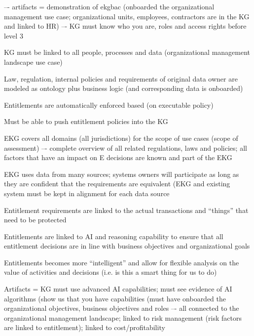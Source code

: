 \begin{scoring}

    \item {} –- artifacts = demonstration of \gls{ekgbac}
          (onboarded the organizational management use case; organizational units, employees, contractors are in
          the KG and linked to HR) –- KG must know who you are, roles and access rights before level 3
    \item KG must be linked to all people, processes and data (organizational management landscape use case)
    \item Law, regulation, internal policies and requirements of original data owner are modeled as ontology
          plus business logic (and corresponding data is onboarded)
    \item Entitlements are automatically enforced based (on executable policy)
    \item Must be able to push entitlement policies into the KG
    \item EKG covers all domains (all jurisdictions) for the scope of use cases (scope of assessment) –-
          complete overview of all related regulations, laws and policies;
          all factors that have an impact on E decisions are known and part of the EKG
    \item EKG uses data from many sources; systems owners will participate as long as they are confident that
          the requirements are equivalent (EKG and existing system must be kept in alignment for each data source
    \item Entitlement requirements are linked to the actual transactions and “things” that need to be protected

\end{scoring}

\kgmmscoringlevelFour

\begin{scoring}

  \item Entitlements are linked to AI and reasoning capability to ensure that all entitlement decisions are
        in line with business objectives and organizational goals
  \item Entitlements becomes more “intelligent” and allow for flexible analysis on the value of
        activities and decisions (i.e. is this a smart thing for us to do)
  \item Artifacts = KG must use advanced AI capabilities; must see evidence of AI algorithms
        (show us that you have  capabilities (must have onboarded the organizational objectives,
        business objectives and roles –- all connected to the organizational management landscape;
        linked to risk management (risk factors are linked to entitlement); linked to cost/profitability

\end{scoring}

